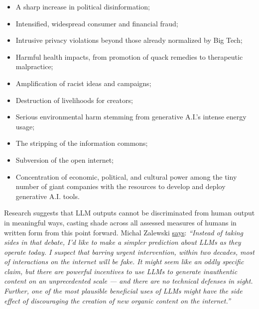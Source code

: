 \begin{itemize}
\item A sharp increase in political disinformation;
\item Intensified, widespread consumer and financial fraud;
\item Intrusive privacy violations beyond those already normalized by Big Tech;
\item Harmful health impacts, from promotion of quack remedies to therapeutic malpractice;
\item Amplification of racist ideas and campaigns;
\item Destruction of livelihoods for creators;
\item Serious environmental harm stemming from generative A.I.’s intense energy usage;
\item The stripping of the information commons;
\item Subversion of the open internet;
\item Concentration of economic, political, and cultural power among the tiny number of giant companies with the resources to develop and deploy generative A.I. tools.
\end{itemize}

Research suggests that LLM outputs cannot be discriminated from human output in meaningful ways, casting shade across all assessed measures of humans in written form \cite{sadasivan2023can} from this point forward. Michal Zalewski \href{https://lcamtuf.substack.com/p/llms-a-bleak-future-ahead}{says}: \textit{``Instead of taking sides in that debate, I’d like to make a simpler prediction about LLMs as they operate today. I suspect that barring urgent intervention, within two decades, most of interactions on the internet will be fake. It might seem like an oddly specific claim, but there are powerful incentives to use LLMs to generate inauthentic content on an unprecedented scale — and there are no technical defenses in sight. Further, one of the most plausible beneficial uses of LLMs might have the side effect of discouraging the creation of new organic content on the internet.''}

